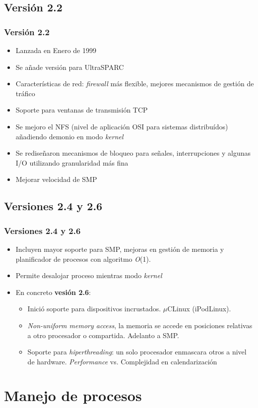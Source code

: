 \documentclass[spanish]{beamer}
\begin{document}
  \subsection{Versi\'{o}n 2.2}
  \frame
  {
    \frametitle{Versi\'{o}n 2.2}
    \begin{itemize}
    	\item Lanzada en Enero de 1999
    	\item Se añade versión para UltraSPARC
		\item Características de red: \textit{firewall} más flexible, mejores mecanismos de gestión de tráfico
		\item Soporte para ventanas de transmisión TCP
		\item Se mejoro el NFS (nivel de aplicación OSI para sistemas distribuídos) añadiendo demonio en modo \textit{kernel}
		\item Se rediseñaron mecanismos de bloqueo para señales, interrupciones y algunas I/O utilizando granularidad más fina
		\item Mejorar velocidad de SMP
    \end{itemize}
  }  

  \subsection{Versiones 2.4 y 2.6}
  \frame
  {
    \frametitle{Versiones 2.4 y 2.6}
    \begin{itemize}
    	\item Incluyen mayor soporte para SMP, mejoras en gestión de memoria y planificador de procesos con algoritmo \textit{O}(1).
    	\item Permite desalojar proceso mientras modo \textit{kernel}
		\item En concreto \textbf{vesión 2.6}:
		\begin{itemize}
			\item Inició soporte para dispositivos incrustados. $\mu$CLinux (iPodLinux).
			\item \textit{Non-uniform memory access}, la memoria se accede en posiciones relativas a otro procesador o compartida. Adelanto a SMP.
			\item Soporte para \textit{hiperthreading}: un solo procesador enmascara otros a nivel de hardware. \textit{Performance} vs. Complejidad en calendarizaci\'{o}n
		\end{itemize}
    \end{itemize}
  }  
  
 \section{Manejo de procesos}
 
\end{document}
